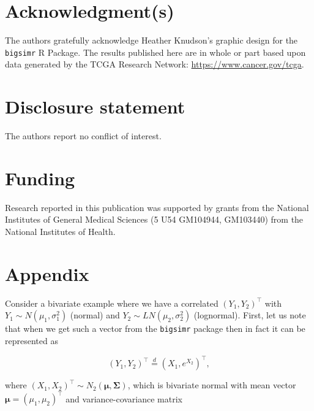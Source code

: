 \documentclass[
]{jss}
\begin{document}
\hypertarget{acknowledgments}{%
\section*{Acknowledgment(s)}\label{acknowledgments}}

The authors gratefully acknowledge Heather Knudson's graphic design for
the \texttt{bigsimr} R Package. The results published here are in whole
or part based upon data generated by the TCGA Research Network:
\url{https://www.cancer.gov/tcga}.

\hypertarget{coi}{%
\section*{Disclosure statement}\label{coi}}

The authors report no conflict of interest.

\hypertarget{funding}{%
\section*{Funding}\label{funding}}

Research reported in this publication was supported by grants from the
National Institutes of General Medical Sciences (5 U54 GM104944,
GM103440) from the National Institutes of Health.

\newpage

\hypertarget{appendix}{%
\section*{Appendix}\label{appendix}}

\noindent Consider a bivariate example where we have a correlated
\((Y_1, Y_2)^\top\) with \(Y_1\sim N(\mu_1, \sigma_1^2)\) (normal) and
\(Y_2\sim LN(\mu_2, \sigma_2^2)\) (lognormal). First, let us note that
when we get such a vector from the \texttt{bigsimr} package then in fact
it can be represented as

\begin{equation}
\label{eq:kram1}
(Y_1, Y_2)^\top \stackrel{d}{=} \left(X_1, e^{X_2}\right)^\top,
\end{equation}

where \((X_1, X_2)^\top \sim N_2(\boldsymbol \mu, \boldsymbol \Sigma)\),
which is bivariate normal with mean vector
\(\boldsymbol \mu = (\mu_1, \mu_2)^\top\) and variance-covariance matrix
\end{document}
